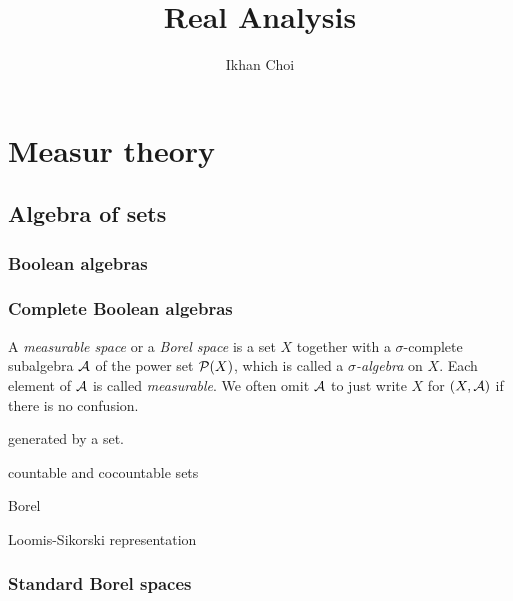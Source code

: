 \documentclass{../../large}
\begin{document}
\title{Real Analysis}
\author{Ikhan Choi}
\maketitle
\tableofcontents

\part{Measur theory}


\chapter{Algebra of sets}


\section{Boolean algebras}



\begin{prb}
\end{prb}



\section{Complete Boolean algebras}


\begin{prb}
\end{prb}


\begin{prb}
A \emph{measurable space} or a \emph{Borel space} is a set $X$ together with a $\sigma$-complete subalgebra $\mathcal{A}$ of the power set $\mathcal{P}(X)$, which is called a \emph{$\sigma$-algebra} on $X$.
Each element of $\mathcal{A}$ is called \emph{measurable}.
We often omit $\mathcal{A}$ to just write $X$ for $(X,\mathcal{A})$ if there is no confusion.
\begin{parts}
\item generated by a set.
\item countable and cocountable sets
\item Borel
\item Loomis-Sikorski representation
\end{parts}
\end{prb}



\section{Standard Borel spaces}
\end{document}
